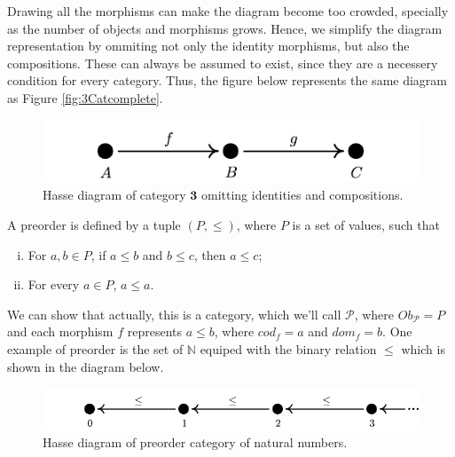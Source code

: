 \begin{example}
Drawing all the morphisms can make the diagram become too crowded, specially
as the number of objects and morphisms grows. Hence, we simplify the
diagram representation by ommiting not only the identity morphisms, but also
the compositions. These can always be assumed to exist, since they are a necessery
condition for every category.
Thus, the figure below represents the same diagram as Figure \ref{fig:3Catcomplete}.

\begin{figure}[H]
  \begin{center}
    \includegraphics{./notebooks/3Catsimple}
  \end{center}
  \caption{Hasse diagram of category $\bm 3$ omitting identities and compositions.}
  \label{fig:3Catsimple}
\end{figure}

\end{example}

\begin{example}[Preorders]
  A preorder is defined by a tuple $(P, \leq)$, where $P$ is a set of values, such that
  \begin{enumerate}[(i)]
    \item For $a,b \in P$, if $a\leq b$ and $b \leq c$, then $a \leq c$;
    \item For every $a \in P$, $a \leq a$.
  \end{enumerate}
  We can show that actually, this is a category, which we'll call $\mathcal P$,
  where $Ob_\mathcal P = P$ and each morphism $f$ represents $a \leq b$, where
  $cod_f = a$ and $dom_f = b$.
  One example of preorder is the set of $\mathbb N$ equiped with the binary relation $\leq$
  which is shown in the diagram below.

\begin{figure}[H]
  \begin{center}
    \includegraphics{./notebooks/NCat}
  \end{center}
  \caption{Hasse diagram of preorder category of natural numbers.}
  \label{fig:NCat}
\end{figure}
\end{example}

